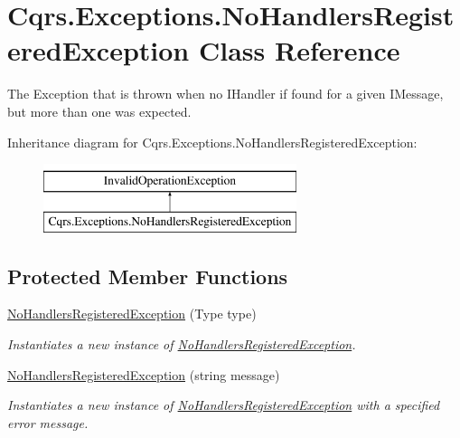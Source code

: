 \hypertarget{classCqrs_1_1Exceptions_1_1NoHandlersRegisteredException}{}\section{Cqrs.\+Exceptions.\+No\+Handlers\+Registered\+Exception Class Reference}
\label{classCqrs_1_1Exceptions_1_1NoHandlersRegisteredException}


The Exception that is thrown when no I\+Handler if found for a given I\+Message, but more than one was expected.  


Inheritance diagram for Cqrs.\+Exceptions.\+No\+Handlers\+Registered\+Exception\+:\begin{figure}[H]
\begin{center}
\leavevmode
\includegraphics[height=2.000000cm]{classCqrs_1_1Exceptions_1_1NoHandlersRegisteredException}
\end{center}
\end{figure}
\subsection*{Protected Member Functions}
\begin{DoxyCompactItemize}
\item 
\hyperlink{classCqrs_1_1Exceptions_1_1NoHandlersRegisteredException_a07fae549945497c218333281933f9373_a07fae549945497c218333281933f9373}{No\+Handlers\+Registered\+Exception} (Type type)
\begin{DoxyCompactList}\small\item\em Instantiates a new instance of \hyperlink{classCqrs_1_1Exceptions_1_1NoHandlersRegisteredException}{No\+Handlers\+Registered\+Exception}. \end{DoxyCompactList}\item 
\hyperlink{classCqrs_1_1Exceptions_1_1NoHandlersRegisteredException_a2e134224b1864868953952274cae8ca4_a2e134224b1864868953952274cae8ca4}{No\+Handlers\+Registered\+Exception} (string message)
\begin{DoxyCompactList}\small\item\em Instantiates a new instance of \hyperlink{classCqrs_1_1Exceptions_1_1NoHandlersRegisteredException}{No\+Handlers\+Registered\+Exception} with a specified error message. \end{DoxyCompactList}\end{DoxyCompactItemize}


